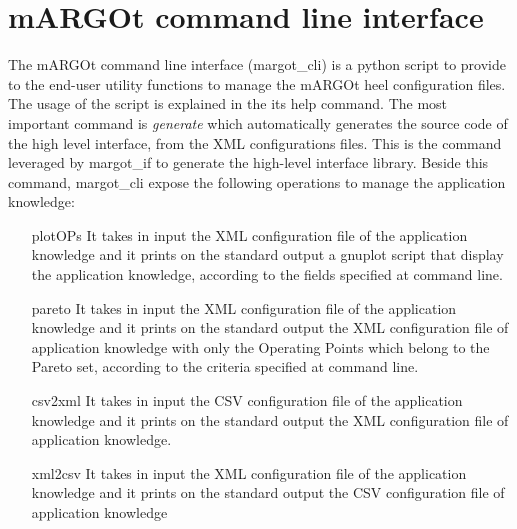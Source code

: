 \section{mARGOt command line interface}

The mARGOt command line interface (margot\_cli) is a python script to provide to the end-user utility functions to manage the mARGOt heel configuration files.
The usage of the script is explained in the its help command.
The most important command is \textit{generate} which automatically generates the source code of the high level interface, from the XML configurations files.
This is the command  leveraged by margot\_if to generate the high-level interface library.
Beside this command, margot\_cli expose the following operations to manage the application knowledge:
\begin{itemize}
	\item[plotOPs] It takes in input the XML configuration file of the application knowledge and it prints on the standard output a gnuplot script that display the application knowledge, according to the fields specified at command line.
	\item[pareto] It takes in input the XML configuration file of the application knowledge and it prints on the standard output the XML configuration file of application knowledge with only the Operating Points which belong to the Pareto set, according to the criteria specified at command line.
	\item[csv2xml] It takes in input the CSV configuration file of the application knowledge and it prints on the standard output the XML configuration file of application knowledge.
	\item[xml2csv] It takes in input the XML configuration file of the application knowledge and it prints on the standard output the CSV configuration file of application knowledge
\end{itemize}

